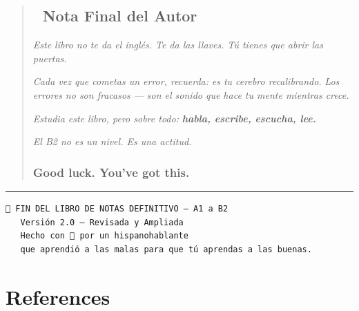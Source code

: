 \documentclass[
  spanish,
  letterpaper,
]{scrbook}
\begin{document}
\begin{quote}
\section{💬 Nota Final del Autor}\label{nota-final-del-autor}

\emph{Este libro no te da el inglés. Te da las llaves.} \emph{Tú tienes
que abrir las puertas.}

\emph{Cada vez que cometas un error, recuerda:} \emph{es tu cerebro
recalibrando.} \emph{Los errores no son fracasos ---} \emph{son el
sonido que hace tu mente mientras crece.}

\emph{Estudia este libro, pero sobre todo:} \textbf{\emph{habla,
escribe, escucha, lee.}}

\emph{El B2 no es un nivel. Es una actitud.}

\subsection{Good luck. You've got this.
🚀}\label{good-luck.-youve-got-this.}
\end{quote}

\begin{center}\rule{0.5\linewidth}{0.5pt}\end{center}

\begin{verbatim}
📓 FIN DEL LIBRO DE NOTAS DEFINITIVO — A1 a B2
   Versión 2.0 — Revisada y Ampliada
   Hecho con 💙 por un hispanohablante
   que aprendió a las malas para que tú aprendas a las buenas.
\end{verbatim}


\chapter*{References}\label{references}


\label{refs}


\backmatter
\end{document}
